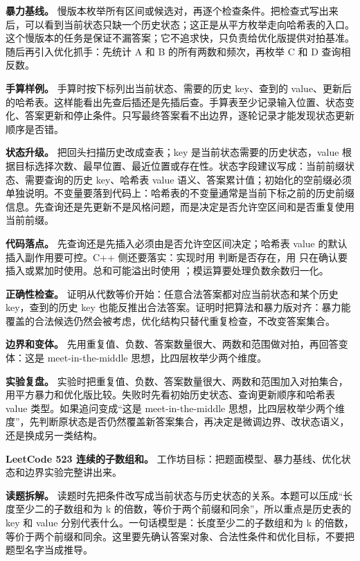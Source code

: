 \textbf{暴力基线。} 慢版本枚举所有区间或候选对，再逐个检查条件。把检查式写出来后，可以看到当前状态只缺一个历史状态；这正是从平方枚举走向哈希表的入口。这个慢版本的任务是保证不漏答案；它不追求快，只负责给优化版提供对拍基准。随后再引入优化抓手：先统计 A 和 B 的所有两数和频次，再枚举 C 和 D 查询相反数。

\textbf{手算样例。} 手算时按下标列出当前状态、需要的历史 key、查到的 value、更新后的哈希表。这样能看出先查后插还是先插后查。手算表至少记录输入位置、状态变化、答案更新和停止条件。只写最终答案看不出边界，逐轮记录才能发现状态更新顺序是否错。

\textbf{状态升级。} 把回头扫描历史改成查表；key 是当前状态需要的历史状态，value 根据目标选择次数、最早位置、最近位置或存在性。状态字段建议写成：当前前缀状态、需要查询的历史 key、哈希表 value 语义、答案累计值；初始化的空前缀必须单独说明。不变量要落到代码上：哈希表的不变量通常是当前下标之前的历史前缀信息。先查询还是先更新不是风格问题，而是决定是否允许空区间和是否重复使用当前前缀。

\textbf{代码落点。} 先查询还是先插入必须由是否允许空区间决定；哈希表 value 的默认插入副作用要可控。C++ 侧还要落实：实现时用  判断是否存在，用  只在确认要插入或累加时使用。总和可能溢出时使用 ；模运算要处理负数余数归一化。

\textbf{正确性检查。} 证明从代数等价开始：任意合法答案都对应当前状态和某个历史 key，查到的历史 key 也能反推出合法答案。证明时把算法和暴力版对齐：暴力能覆盖的合法候选仍然会被考虑，优化结构只替代重复检查，不改变答案集合。

\textbf{边界和变体。} 先用重复值、负数、答案数量很大、两数和范围做对拍，再回答变体：这是 meet-in-the-middle 思想，比四层枚举少两个维度。

\textbf{实验复盘。} 实验时把重复值、负数、答案数量很大、两数和范围加入对拍集合，用平方暴力和优化版比较。失败时先看初始历史状态、查询更新顺序和哈希表 value 类型。如果追问变成“这是 meet-in-the-middle 思想，比四层枚举少两个维度”，先判断原状态是否仍然覆盖新答案集合，再决定是微调边界、改状态语义，还是换成另一类结构。

\noindent\textbf{LeetCode 523 连续的子数组和。} 工作坊目标：把题面模型、暴力基线、优化状态和边界实验完整讲出来。

\textbf{读题拆解。} 读题时先把条件改写成当前状态与历史状态的关系。本题可以压成“长度至少二的子数组和为 k 的倍数，等价于两个前缀和同余”，所以重点是历史表的 key 和 value 分别代表什么。一句话模型是：长度至少二的子数组和为 k 的倍数，等价于两个前缀和同余。这里要先确认答案对象、合法性条件和优化目标，不要把题型名字当成推导。

